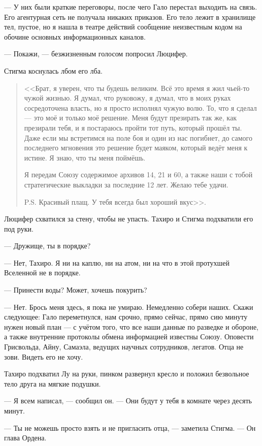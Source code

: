 --- У них были краткие переговоры, после чего Гало перестал выходить на связь.
Его агентурная сеть не получала никаких приказов.
Его тело лежит в хранилище тел, пустое, но я нашла в театре действий сообщение неизвестным кодом на обочине основных информационных каналов.

--- Покажи, --- безжизненным голосом попросил Люцифер.

Стигма коснулась лбом его лба.

\begin{quote}
<<Брат, я уверен, что ты будешь великим.
Всё это время я жил чьей-то чужой жизнью.
Я думал, что руковожу, я думал, что в моих руках сосредоточена власть, но я просто исполнял чужую волю.
То, что я сделал --- это моё и только моё решение.
Меня будут презирать так же, как презирали тебя, и я постараюсь пройти тот путь, который прошёл ты.
Даже если мы встретимся на поле боя и один из нас погибнет, до самого последнего мгновения это решение будет маяком, который ведёт меня к истине.
Я знаю, что ты меня поймёшь.

Я передам Союзу содержимое архивов 14, 21 и 60, а также наши с тобой стратегические выкладки за последние 12 лет.
Желаю тебе удачи.

P.S. Красивый плащ.
У тебя всегда был хороший вкус>>.
\end{quote}

Люцифер схватился за стену, чтобы не упасть.
Тахиро и Стигма подхватили его под руки.

--- Дружище, ты в порядке?

--- Нет, Тахиро.
Я ни на каплю, ни на атом, ни на что в этой протухшей Вселенной не в порядке.

--- Принести воды?
Может, хочешь покурить?

--- Нет.
Брось меня здесь, я пока не умираю.
Немедленно собери наших.
Скажи следующее: Гало переметнулся, нам срочно, прямо сейчас, прямо сию минуту нужен новый план --- с учётом того, что все наши данные по разведке и обороне, а также внутренние протоколы обмена информацией известны Союзу.
Оповести Грисвольда, Айну, Самаэла, ведущих научных сотрудников, легатов.
Отца не зови.
Видеть его не хочу.

Тахиро подхватил Лу на руки, пинком развернул кресло и положил безвольное тело друга на мягкие подушки.

--- Я всем написал, --- сообщил он.
--- Они будут у тебя в комнате через десять минут.

--- Ты не можешь просто взять и не пригласить отца, --- заметила Стигма.
--- Он глава Ордена.


